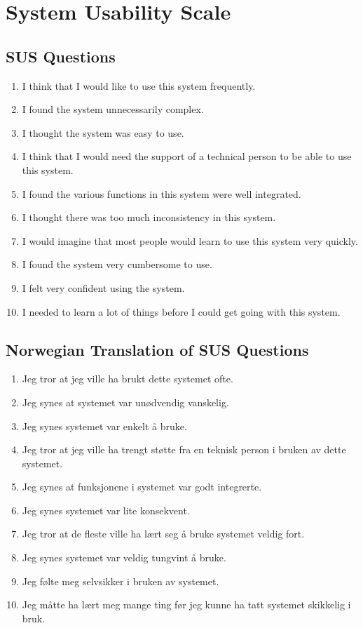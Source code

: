 \documentclass[../Main/thesis.tex]{subfiles}
\begin{document}
\chapter{System Usability Scale}
\section{SUS Questions}
\begin{enumerate}
	\item I think that I would like to use this system frequently.
	\item I found the system unnecessarily complex.
	\item I thought the system was easy to use.
	\item I think that I would need the support of a technical person to be able to use this system.
	\item I found the various functions in this system were well integrated.
	\item I thought there was too much inconsistency in this system.
	\item I would imagine that most people would learn to use this system very quickly.
	\item I found the system very cumbersome to use.
	\item I felt very confident using the system.
	\item I needed to learn a lot of things before I could get going with this system.
\end{enumerate}

\newpage

\section{Norwegian Translation of SUS Questions}
\begin{enumerate}
	\item Jeg tror at jeg ville ha brukt dette systemet ofte.
	\item Jeg synes at systemet var unødvendig vanskelig.
	\item Jeg synes systemet var enkelt å bruke.
	\item Jeg tror at jeg ville ha trengt støtte fra en teknisk person i bruken av dette systemet.
	\item Jeg synes at funksjonene i systemet var godt integrerte.
	\item Jeg synes systemet var lite konsekvent.
	\item Jeg tror at de fleste ville ha lært seg å bruke systemet veldig fort.
	\item Jeg synes systemet var veldig tungvint å bruke.
	\item Jeg følte meg selvsikker i bruken av systemet.
	\item Jeg måtte ha lært meg mange ting før jeg kunne ha tatt systemet skikkelig i bruk.
\end{enumerate}
\end{document}
